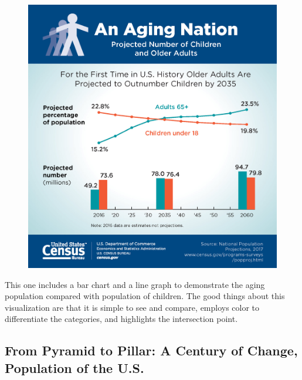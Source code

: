 \documentclass[]{book}
\theoremstyle{definition}
\theoremstyle{definition}
\theoremstyle{definition}
\theoremstyle{remark}
\begin{document}
\begin{figure}
\centering
\includegraphics{images/aging_nation.jpg}
\caption{}
\end{figure}

This one includes a bar chart and a line graph to demonstrate the aging
population compared with population of children. The good things about
this visualization are that it is simple to see and compare, employs
color to differentiate the categories, and highlights the intersection
point.

\subsection{From Pyramid to Pillar: A Century of Change, Population of
the
U.S.}\label{from-pyramid-to-pillar-a-century-of-change-population-of-the-u.s.}

\citep{population_pyramid}
\end{document}
